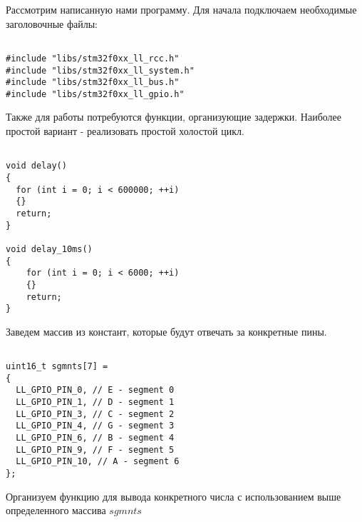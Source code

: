     
Рассмотрим написанную нами программу. Для начала подключаем необходимые заголовочные файлы:
\begin{verbatim}

#include "libs/stm32f0xx_ll_rcc.h"
#include "libs/stm32f0xx_ll_system.h"
#include "libs/stm32f0xx_ll_bus.h"
#include "libs/stm32f0xx_ll_gpio.h"

\end{verbatim}

Также для работы потребуются функции, организующие задержки. Наиболее простой вариант - реализовать простой холостой цикл.

\begin{verbatim}
    
void delay()
{
  for (int i = 0; i < 600000; ++i)
  {}
  return;
}

void delay_10ms()
{
    for (int i = 0; i < 6000; ++i)
    {}
    return;
}

\end{verbatim}

Заведем массив из констант, которые будут отвечать за конкретные пины. 
\begin{verbatim}
    
uint16_t sgmnts[7] =
{ 
  LL_GPIO_PIN_0, // E - segment 0
  LL_GPIO_PIN_1, // D - segment 1
  LL_GPIO_PIN_3, // C - segment 2
  LL_GPIO_PIN_4, // G - segment 3
  LL_GPIO_PIN_6, // B - segment 4
  LL_GPIO_PIN_9, // F - segment 5 
  LL_GPIO_PIN_10, // A - segment 6
};

\end{verbatim}

Организуем функцию для вывода конкретного числа с использованием выше определенного массива $sgmnts$

